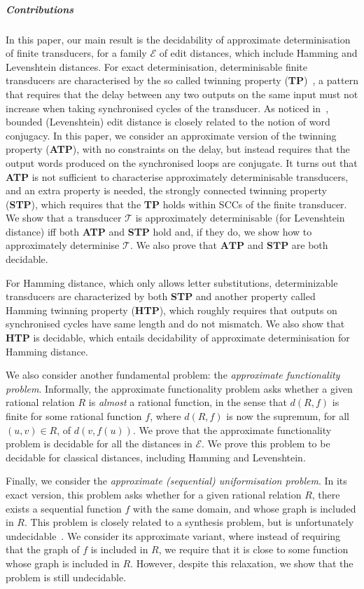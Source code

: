 \documentclass[a4paper,UKenglish,cleveref, autoref, thm-restate,authorcolumns, colorlinks]{lipics-v2021}
\newcommand\calT{\mathcal{T}}
\newcommand{\TP}[0]{\textbf{TP}}
\newcommand{\ATP}[0]{\textbf{ATP}}
\newcommand{\STP}[0]{\textbf{STP}}
\newcommand{\HTP}[0]{\textbf{HTP}}
\begin{document}
\subparagraph*{Contributions} In this paper, our main result is the decidability of approximate determinisation of finite transducers, for a family $\mathcal{E}$
of edit distances, which include Hamming and Levenshtein distances. 
For exact determinisation, determinisable finite transducers are characterised by the so called twinning property (\TP)~\cite{twinningproperty,twinningproperty0, ChoffrutG99}, a pattern that requires that the delay between any two outputs on the same input must not increase when taking synchronised cycles of the transducer. 
As noticed in~\cite{editdistance}, bounded (Levenshtein) edit distance is closely related to the notion of word conjugacy. In this paper, we consider an approximate version of the twinning property (\ATP{}), with no constraints on the delay, but instead requires that the output words produced on the synchronised loops are conjugate. It turns out that \ATP{} is not sufficient to characterise approximately determinisable transducers, and an extra property is needed, the strongly connected twinning property (\STP{}), which requires that the \TP{} holds within SCCs of the finite transducer. We show that a transducer $\calT$ is approximately determinisable (for Levenshtein distance) iff both \ATP{} and \STP{} hold and, if they do, we show how to approximately determinise $\calT$. We also prove that $\ATP{}$ and $\STP{}$ are both decidable.

For Hamming distance, which only allows letter substitutions, determinizable transducers are characterized by both \STP{} and another property called Hamming twinning property (\HTP{}), which roughly requires that outputs on synchronised cycles have same length and do not mismatch. We also show that \HTP{} is decidable, which entails decidability of approximate determinisation for Hamming distance. 



We also consider another fundamental problem: the \emph{approximate functionality problem}. Informally, the approximate functionality problem asks whether a given rational relation $R$ is \emph{almost} a rational function, in the sense that $d(R,f)$ is finite for some rational function $f$, where $d(R,f)$ is now the supremum, for all $(u,v)\in R$, of $d(v,f(u))$. We prove that the approximate functionality problem is decidable for all the distances in $\mathcal{E}$. We prove this problem to be decidable for classical distances, including Hamming and Levenshtein. 

Finally, we consider the \emph{approximate (sequential) uniformisation problem}. In its exact version, this problem asks whether for a given rational relation $R$, there exists a sequential function $f$ with the same domain, and whose graph is included in $R$. This problem is closely related to a synthesis problem, but is unfortunately undecidable~\cite{LoC,DBLP:conf/icalp/FiliotJLW16}. We consider its approximate variant, where instead of requiring that the graph of $f$ is included in $R$, we require that it is close to some function whose graph is included in $R$. However, despite this relaxation, we show that the problem is still undecidable. 
\end{document}
